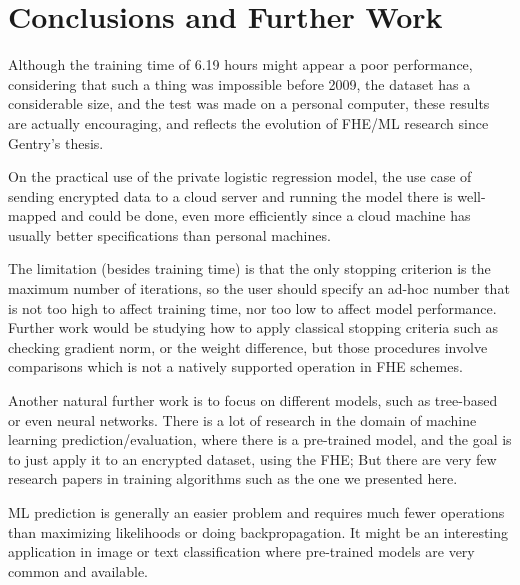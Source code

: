 \chapter{Conclusions and Further Work}
\label{ch:conclusions}

Although the training time of 6.19 hours might appear a poor performance, considering that such a thing was impossible before 2009, the dataset has a considerable size, and the test was made on a personal computer, these results are actually encouraging, and reflects the evolution of FHE/ML research since Gentry's thesis.

On the practical use of the private logistic regression model, the use case of sending encrypted data to a cloud server and running the model there is well-mapped and could be done, even more efficiently since a cloud machine has usually better specifications than personal machines. 

The limitation (besides training time) is that the only stopping criterion is the maximum number of iterations, so the user should specify an ad-hoc number that is not too high to affect training time, nor too low to affect model performance. Further work would be studying how to apply classical stopping criteria such as checking gradient norm, or the weight difference, but those procedures involve comparisons which is not a natively supported operation in FHE schemes.

Another natural further work is to focus on different models, such as tree-based or even neural networks. There is a lot of research in the domain of machine learning prediction/evaluation, where there is a pre-trained model, and the goal is to just apply it to an encrypted dataset, using the FHE; But there are very few research papers in training algorithms such as the one we presented here.

ML prediction is generally an easier problem and requires much fewer operations than maximizing likelihoods or doing backpropagation. It might be an interesting application in image or text classification where pre-trained models are very common and available.


